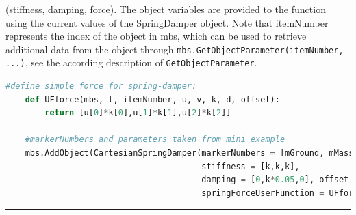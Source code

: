     (stiffness, damping, force).
    The object variables are provided to the function using the current values of the SpringDamper object.
    Note that itemNumber represents the index of the object in mbs, which can be used to retrieve additional data from the object through
    \texttt{mbs.GetObjectParameter(itemNumber, ...)}, see the according description of \texttt{GetObjectParameter}.
    \finishTable
    \userFunctionExample{}
    \pythonstyle
    \begin{lstlisting}[language=Python]
    #define simple force for spring-damper:
    def UFforce(mbs, t, itemNumber, u, v, k, d, offset): 
        return [u[0]*k[0],u[1]*k[1],u[2]*k[2]]
    
    #markerNumbers and parameters taken from mini example
    mbs.AddObject(CartesianSpringDamper(markerNumbers = [mGround, mMass], 
                                        stiffness = [k,k,k], 
                                        damping = [0,k*0.05,0], offset = [0,0,0],
                                        springForceUserFunction = UFforce))
    \end{lstlisting}
\vspace{6pt}\par\noindent\rule{\textwidth}{0.4pt}
\label{miniExample_ObjectConnectorCartesianSpringDamper}
\pythonstyle
